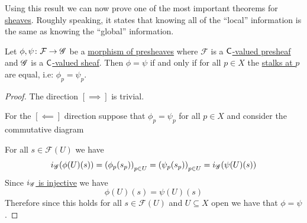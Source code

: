 \documentclass[../../main]{subfiles}
\begin{document}
Using this result we can now prove one of the most important theorems for \hyperref[def:sheaf]{sheaves}.
Roughly speaking, it states that knowing all of the ``local'' information is the same as knowing the ``global'' information.
\begin{theorem}\label{thm:sheaf-morphism-determined-by-stalks}
  Let \(\phi, \psi\colon \mathcal{F} \to \mathscr{G}\) be a \hyperref[def:presheaf]{morphism of presheaves} where \(\mathcal{F}\) is a \hyperref[def:presheaf]{\(\mathsf{C}\)-valued presheaf} and \(\mathscr{G}\) is a \hyperref[def:sheaf]{\(\mathsf{C}\)-valued sheaf}.
  Then \(\phi = \psi\) if and only if for all \(p \in X\) the \hyperref[def:stalk]{stalks at \(p\)} are equal, i.e: \(\phi_{p} = \psi_{p}\).
\end{theorem}
\begin{proof}
  The direction \([\implies]\) is trivial.

  For the \([\impliedby]\) direction suppose that \(\phi_{p} = \psi_{p}\) for all \(p \in X\) and consider the commutative diagram
  \begin{center}
  \end{center}
  For all \(s \in \mathcal{F}(U)\) we have
  \begin{equation*}
    i_{\mathscr{G}}(\phi(U)(s)) = \left( \phi_{p}(s_{p}) \right)_{p \in U} = \left( \psi_{p}(s_{p}) \right)_{p \in U} = i_{\mathscr{G}}(\psi(U)(s))
  \end{equation*}
  Since \hyperref[lemma:sheaf-determined-by-germs]{\(i_{\mathscr{G}}\) is injective} we have
  \begin{equation*}
    \phi(U)(s) = \psi(U)(s)
  \end{equation*}
  Therefore since this holds for all \(s \in \mathcal{F}(U)\) and \(U \subseteq X\) open we have that \(\phi = \psi\).
\end{proof}
\end{document}
